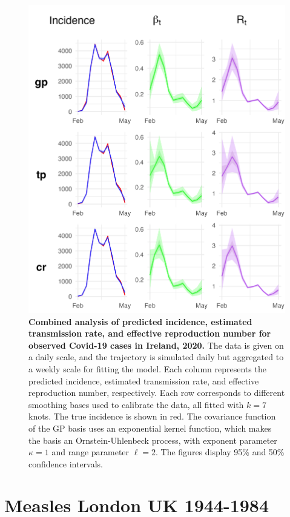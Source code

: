 \documentclass[
11pt, %
oneside, %
english, %
singlespacing, %
]{macthesis} %
\begin{document}
\begin{figure}[H]
\centering
\includegraphics[width=\textwidth, height = \textwidth]{figure/Ireland/ireland_combined.png}
\caption[Combined Analysis of Covid-19 in Ireland (2020)]{\textbf{Combined analysis of predicted incidence, estimated transmission rate, and effective reproduction number for observed Covid-19 cases in Ireland, 2020.} The data is given on a daily scale, and the trajectory is simulated daily but aggregated to a weekly scale for fitting the model. Each column represents the predicted incidence, estimated transmission rate, and effective reproduction number, respectively. Each row corresponds to different smoothing bases used to calibrate the data, all fitted with \(k=7\) knots. The true incidence is shown in red. The covariance function of the GP basis uses an exponential kernel function, which makes the basis an Ornstein-Uhlenbeck process, with exponent parameter \(\kappa = 1\) and range parameter \(\ell = 2\). The figures display 95\% and 50\% confidence intervals.}
\label{fig:ireland_combined}
\end{figure}

\section{Measles London UK 1944-1984}\label{Measles}
\end{document}
